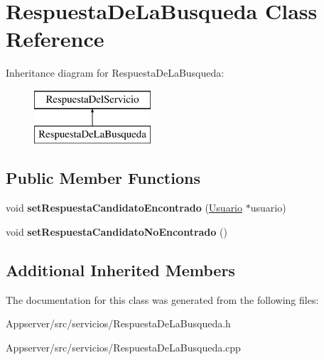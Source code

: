 \hypertarget{classRespuestaDeLaBusqueda}{}\section{Respuesta\+De\+La\+Busqueda Class Reference}
\label{classRespuestaDeLaBusqueda}
Inheritance diagram for Respuesta\+De\+La\+Busqueda\+:\begin{figure}[H]
\begin{center}
\leavevmode
\includegraphics[height=2.000000cm]{classRespuestaDeLaBusqueda}
\end{center}
\end{figure}
\subsection*{Public Member Functions}
\begin{DoxyCompactItemize}
\item 
void {\bfseries set\+Respuesta\+Candidato\+Encontrado} (\hyperlink{classUsuario}{Usuario} $\ast$usuario)\hypertarget{classRespuestaDeLaBusqueda_a489698777a915943f7a92d1d4277e352}{}\label{classRespuestaDeLaBusqueda_a489698777a915943f7a92d1d4277e352}

\item 
void {\bfseries set\+Respuesta\+Candidato\+No\+Encontrado} ()\hypertarget{classRespuestaDeLaBusqueda_af8e37fb7da8b74e0ec8e29db493d19a9}{}\label{classRespuestaDeLaBusqueda_af8e37fb7da8b74e0ec8e29db493d19a9}

\end{DoxyCompactItemize}
\subsection*{Additional Inherited Members}


The documentation for this class was generated from the following files\+:\begin{DoxyCompactItemize}
\item 
Appserver/src/servicios/Respuesta\+De\+La\+Busqueda.\+h\item 
Appserver/src/servicios/Respuesta\+De\+La\+Busqueda.\+cpp\end{DoxyCompactItemize}
